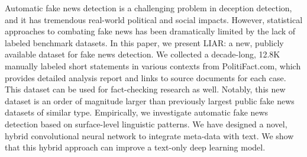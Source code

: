 Automatic fake news detection is a challenging problem in deception detection, and it has tremendous real-world political and social impacts. However, statistical approaches to combating fake news has been dramatically limited by the lack of labeled benchmark datasets. In this paper, we present LIAR: a new, publicly available dataset for fake news detection. We collected a decade-long, 12.8K manually labeled short statements in various contexts from PolitiFact.com, which provides detailed analysis report and links to source documents for each case. This dataset can be used for fact-checking research as well. Notably, this new dataset is an order of magnitude larger than previously largest public fake news datasets of similar type. Empirically, we investigate automatic fake news detection based on surface-level linguistic patterns. We have designed a novel, hybrid convolutional neural network to integrate meta-data with text. We show that this hybrid approach can improve a text-only deep learning model.
